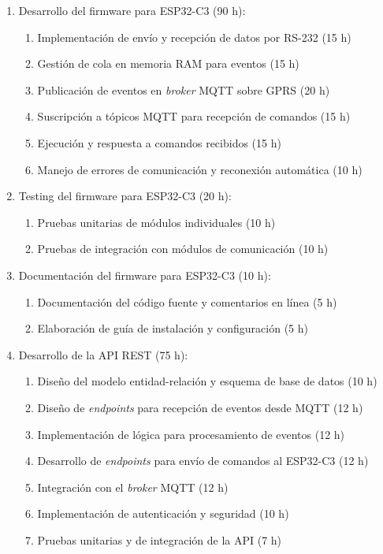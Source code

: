 \documentclass[
11pt, %
]{charter}
\begin{document}
\begin{enumerate}
\item Desarrollo del firmware para ESP32-C3 (90 h):
\begin{enumerate}
\item Implementación de envío y recepción de datos por RS-232 (15 h)
\item Gestión de cola en memoria RAM para eventos (15 h)
\item Publicación de eventos en \textit{broker} MQTT sobre GPRS (20 h)
\item Suscripción a tópicos MQTT para recepción de comandos (15 h)
\item Ejecución y respuesta a comandos recibidos (15 h)
\item Manejo de errores de comunicación y reconexión automática (10 h)
\end{enumerate}
\item Testing del firmware para ESP32-C3 (20 h):
\begin{enumerate}
\item Pruebas unitarias de módulos individuales (10 h)
\item Pruebas de integración con módulos de comunicación (10 h)
\end{enumerate}
\item Documentación del firmware para ESP32-C3 (10 h):
\begin{enumerate}
\item Documentación del código fuente y comentarios en línea (5 h)
\item Elaboración de guía de instalación y configuración (5 h)
\end{enumerate}
\item Desarrollo de la API REST (75 h):
\begin{enumerate}
  \item Diseño del modelo entidad-relación y esquema de base de datos (10 h)
  \item Diseño de \textit{endpoints} para recepción de eventos desde MQTT (12 h)
  \item Implementación de lógica para procesamiento de eventos (12 h)
  \item Desarrollo de \textit{endpoints} para envío de comandos al ESP32-C3 (12 h)
  \item Integración con el  \textit{broker} MQTT (12 h)
  \item Implementación de autenticación y seguridad (10 h)
  \item Pruebas unitarias y de integración de la API (7 h)
\end{enumerate}

\end{enumerate}
\end{document}

